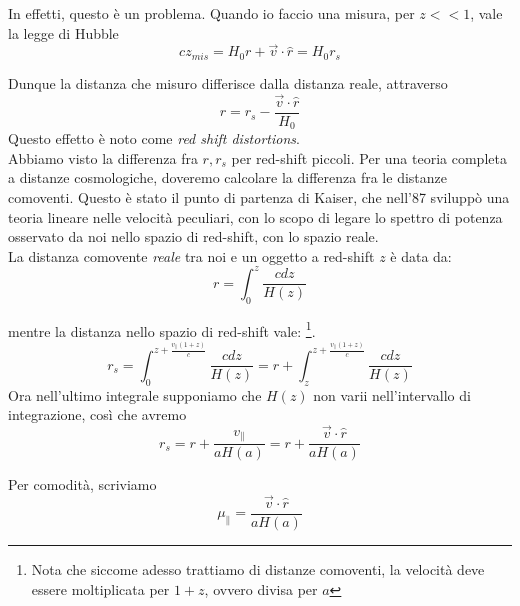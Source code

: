 \documentclass{report}
\begin{document}
In effetti, questo è un problema. Quando io faccio una misura, per \(z <<1\), vale la legge di Hubble
\begin{equation}
    cz_{mis} = H_0r + \vec{v}\cdot \hat{r} = H_0 r_s
\end{equation}

Dunque la distanza che misuro differisce dalla distanza reale, attraverso 
\begin{equation}
    r = r_s - \frac{\vec{v}\cdot \hat{r}}{H_0}
\end{equation}
Questo effetto è noto come \emph{red shift distortions}. \\
Abbiamo visto la differenza fra \(r, r_s\) per red-shift piccoli. Per una teoria completa a distanze cosmologiche, doveremo calcolare la differenza fra le distanze comoventi. Questo è stato il punto di partenza di Kaiser,  che nell'87 sviluppò una teoria lineare nelle velocità peculiari, con lo scopo di legare lo spettro di potenza osservato da noi nello spazio di red-shift, con lo spazio reale. \\

La distanza comovente \emph{reale} tra noi e un oggetto a red-shift $z$ è data da: 
\begin{equation}
    r = \int_0^z \frac{cdz}{H(z)}
\end{equation}

mentre la distanza nello spazio di red-shift vale: \footnote{Nota che siccome adesso trattiamo di distanze comoventi, la velocità deve essere moltiplicata per \(1+z\), ovvero divisa per \(a\)}. 
\begin{equation}
    r_s = \int_0^{z + \frac{v_\parallel(1+z)}{c}}\frac{cdz}{H(z)} = r + \int_z^{z+\frac{v_\parallel(1+z)}{c}} \frac{cdz}{H(z)}
\end{equation}
Ora nell'ultimo integrale supponiamo che $H(z)$ non varii nell'intervallo di integrazione, così che avremo 
\begin{equation}
    r_s = r + \frac{v_{\parallel}}{aH(a)} = r + \frac{\vec{v} \cdot\hat{r}}{aH(a)} 
\end{equation}

Per comodità, scriviamo 
\begin{equation}
    \mu_{\parallel} = \frac{\vec{v} \cdot\hat{r}}{aH(a)}
\end{equation}
\end{document}
